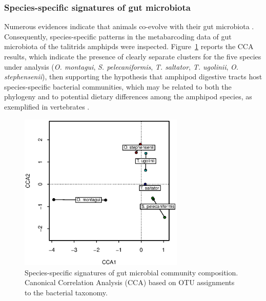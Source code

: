 \subsubsection{Species-specific signatures of gut microbiota}
Numerous evidences indicate that animals co-evolve with their gut microbiota \cite{ley2008worlds}. Consequently, species-specific patterns in the metabarcoding data of gut microbiota of the talitrids amphipds were inspected. Figure~\ref{fig:2talkal} reports the CCA  results, which indicate the presence of clearly separate clusters for the five species under analysis (\textit{O. montagui}, \textit{S. pelecaniformis}, \textit{T. saltator}, \textit{T. ugolinii}, \textit{O. stephensenii}), then supporting the hypothesis that amphipod digestive tracts host species-specific bacterial communities, which may be related to both the phylogeny and to potential dietary differences among the amphipod species, as exemplified in vertebrates \cite{ley2008worlds}.\\
\begin{figure}[!tb]
	\centering
	\includegraphics[width=0.7\textwidth]{./figures/Chapter_6/Figure_2_talkaled.eps}
  	\caption{Species-specific signatures of gut microbial community composition. Canonical Correlation Analysis (CCA) based
on OTU assignments to the bacterial taxonomy.\label{fig:2talkal}}
\end{figure}
